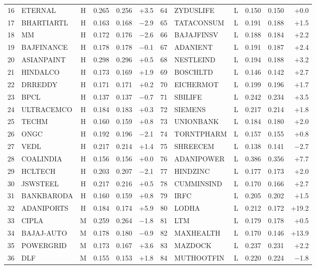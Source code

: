 \documentclass[11pt,a4paper]{article}
\begin{document}
\begin{table}[H]
\begin{adjustbox}{max width=\textwidth}
\begin{tabular}{rlcrrr|rlcrrr}
16 & ETERNAL & H & 0.265 & 0.256 & +3.5 & 64 & ZYDUSLIFE & L & 0.150 & 0.150 & +0.0 \\
17 & BHARTIARTL & H & 0.163 & 0.168 & $-$2.9 & 65 & TATACONSUM & L & 0.191 & 0.188 & +1.5 \\
18 & MM & H & 0.172 & 0.176 & $-$2.6 & 66 & BAJAJFINSV & L & 0.188 & 0.184 & +2.2 \\
19 & BAJFINANCE & H & 0.178 & 0.178 & $-$0.1 & 67 & ADANIENT & L & 0.191 & 0.187 & +2.4 \\
20 & ASIANPAINT & H & 0.298 & 0.296 & +0.5 & 68 & NESTLEIND & L & 0.194 & 0.188 & +3.2 \\
21 & HINDALCO & H & 0.173 & 0.169 & +1.9 & 69 & BOSCHLTD & L & 0.146 & 0.142 & +2.7 \\
22 & DRREDDY & H & 0.171 & 0.171 & +0.2 & 70 & EICHERMOT & L & 0.199 & 0.196 & +1.7 \\
23 & BPCL & H & 0.137 & 0.137 & $-$0.7 & 71 & SBILIFE & L & 0.242 & 0.234 & +3.5 \\
24 & ULTRACEMCO & H & 0.184 & 0.183 & +0.3 & 72 & SIEMENS & L & 0.217 & 0.214 & +1.8 \\
25 & TECHM & H & 0.160 & 0.159 & +0.8 & 73 & UNIONBANK & L & 0.184 & 0.180 & +2.0 \\
26 & ONGC & H & 0.192 & 0.196 & $-$2.1 & 74 & TORNTPHARM & L & 0.157 & 0.155 & +0.8 \\
27 & VEDL & H & 0.217 & 0.214 & +1.4 & 75 & SHREECEM & L & 0.138 & 0.141 & $-$2.7 \\
28 & COALINDIA & H & 0.156 & 0.156 & +0.0 & 76 & ADANIPOWER & L & 0.386 & 0.356 & +7.7 \\
29 & HCLTECH & H & 0.203 & 0.207 & $-$2.1 & 77 & HINDZINC & L & 0.177 & 0.173 & +2.0 \\
30 & JSWSTEEL & H & 0.217 & 0.216 & +0.5 & 78 & CUMMINSIND & L & 0.170 & 0.166 & +2.7 \\
31 & BANKBARODA & H & 0.160 & 0.159 & +0.8 & 79 & IRFC & L & 0.205 & 0.202 & +1.5 \\
32 & ADANIPORTS & H & 0.184 & 0.174 & +5.9 & 80 & LODHA & L & 0.212 & 0.172 & +19.2 \\
33 & CIPLA & M & 0.259 & 0.264 & $-$1.8 & 81 & LTM & L & 0.179 & 0.178 & +0.5 \\
34 & BAJAJ-AUTO & M & 0.178 & 0.180 & $-$0.9 & 82 & MAXHEALTH & L & 0.170 & 0.146 & +13.9 \\
35 & POWERGRID & M & 0.173 & 0.167 & +3.6 & 83 & MAZDOCK & L & 0.237 & 0.231 & +2.2 \\
36 & DLF & M & 0.155 & 0.153 & +1.8 & 84 & MUTHOOTFIN & L & 0.220 & 0.224 & $-$1.8 \\

\end{tabular}
\end{adjustbox}
\end{table}
\end{document}
